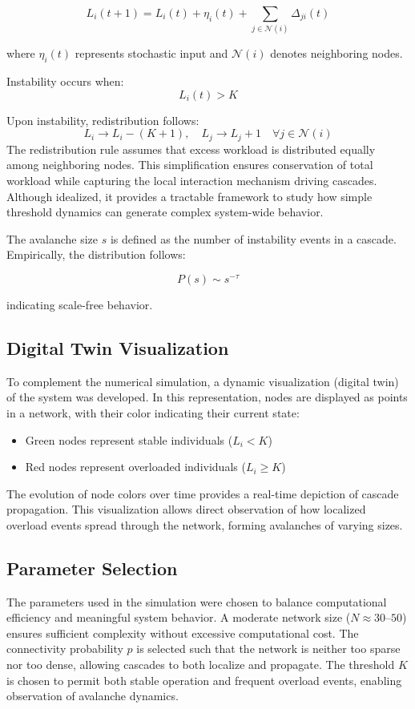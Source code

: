 \documentclass[12pt]{article}
\begin{document}
\[
L_i(t+1) = L_i(t) + \eta_i(t) + \sum_{j \in \mathcal{N}(i)} \Delta_{ji}(t)
\]

where $\eta_i(t)$ represents stochastic input and $\mathcal{N}(i)$ denotes neighboring nodes.

Instability occurs when:
\[
L_i(t) > K
\]

Upon instability, redistribution follows:
\[
L_i \rightarrow L_i - (K+1), \quad L_j \rightarrow L_j + 1 \quad \forall j \in \mathcal{N}(i)
\]
The redistribution rule assumes that excess workload is distributed equally among neighboring nodes. This simplification ensures conservation of total workload while capturing the local interaction mechanism driving cascades. Although idealized, it provides a tractable framework to study how simple threshold dynamics can generate complex system-wide behavior.

The avalanche size $s$ is defined as the number of instability events in a cascade. Empirically, the distribution follows:

\[
P(s) \sim s^{-\tau}
\]

indicating scale-free behavior.
\subsection{Digital Twin Visualization}

To complement the numerical simulation, a dynamic visualization (digital twin) of the system was developed. In this representation, nodes are displayed as points in a network, with their color indicating their current state:

\begin{itemize}
\item Green nodes represent stable individuals ($L_i < K$)
\item Red nodes represent overloaded individuals ($L_i \geq K$)
\end{itemize}

The evolution of node colors over time provides a real-time depiction of cascade propagation. This visualization allows direct observation of how localized overload events spread through the network, forming avalanches of varying sizes.

\subsection{Parameter Selection}

The parameters used in the simulation were chosen to balance computational efficiency and meaningful system behavior. A moderate network size ($N \approx 30$–$50$) ensures sufficient complexity without excessive computational cost. The connectivity probability $p$ is selected such that the network is neither too sparse nor too dense, allowing cascades to both localize and propagate. The threshold $K$ is chosen to permit both stable operation and frequent overload events, enabling observation of avalanche dynamics.
\end{document}
